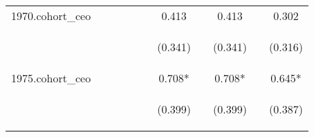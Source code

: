 \begin{center}
\begin{tabular}{lcccccccccc}
1970.cohort\_ceo &  &  &  &  &  & 0.413 &  & 0.413 &  & 0.302 \\
\vspace{4pt} & \begin{footnotesize}\end{footnotesize} & \begin{footnotesize}\end{footnotesize} & \begin{footnotesize}\end{footnotesize} & \begin{footnotesize}\end{footnotesize} & \begin{footnotesize}\end{footnotesize} & \begin{footnotesize}(0.341)\end{footnotesize} & \begin{footnotesize}\end{footnotesize} & \begin{footnotesize}(0.341)\end{footnotesize} & \begin{footnotesize}\end{footnotesize} & \begin{footnotesize}(0.316)\end{footnotesize} \\
1975.cohort\_ceo &  &  &  &  &  & 0.708* &  & 0.708* &  & 0.645* \\
\vspace{4pt} & \begin{footnotesize}\end{footnotesize} & \begin{footnotesize}\end{footnotesize} & \begin{footnotesize}\end{footnotesize} & \begin{footnotesize}\end{footnotesize} & \begin{footnotesize}\end{footnotesize} & \begin{footnotesize}(0.399)\end{footnotesize} & \begin{footnotesize}\end{footnotesize} & \begin{footnotesize}(0.399)\end{footnotesize} & \begin{footnotesize}\end{footnotesize} & \begin{footnotesize}(0.387)\end{footnotesize} \\

\end{tabular}
\end{center}
